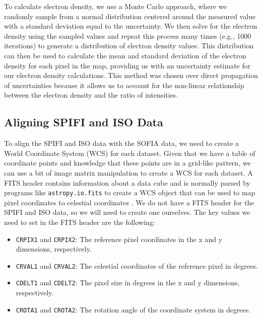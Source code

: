 To calculate electron density, we use a Monte Carlo approach, where we randomly sample from a normal distribution centered around the measured value with a standard deviation equal to the uncertainty.
We then solve for the electron density using the sampled values and repeat this process many times (e.g., 1000 iterations) to generate a distribution of electron density values.
This distribution can then be used to calculate the mean and standard deviation of the electron density for each pixel in the map, providing us with an uncertainty estimate for our electron density calculations.
This method was chosen over direct propagation of uncertainties because it allows us to account for the non-linear relationship between the electron density and the ratio of intensities.

\subsection{Aligning SPIFI and ISO Data}
\label{carina/sec:fits_fit}
To align the SPIFI and ISO data with the SOFIA data, we need to create a World Coordinate System (WCS) for each dataset.
Given that we have a table of coordinate points and knowledge that these points are in a grid-like pattern, we can use a bit of image matrix manipulation to create a WCS for each dataset.
A FITS header contains information about a data cube and is normally parsed by programs like \texttt{astropy.io.fits} to create a WCS object that can be used to map pixel coordinates to celestial coordinates \parencite{wells1979fits}.
We do not have a FITS header for the SPIFI and ISO data, so we will need to create one ourselves.
The key values we need to set in the FITS header are the following:
\begin{itemize}
    \item \texttt{CRPIX1} and \texttt{CRPIX2}: The reference pixel coordinates in the x and y dimensions, respectively.
    \item \texttt{CRVAL1} and \texttt{CRVAL2}: The celestial coordinates of the reference pixel in degrees.
    \item \texttt{CDELT1} and \texttt{CDELT2}: The pixel size in degrees in the x and y dimensions, respectively.
    \item \texttt{CROTA1} and \texttt{CROTA2}: The rotation angle of the coordinate system in degrees.
\end{itemize}

